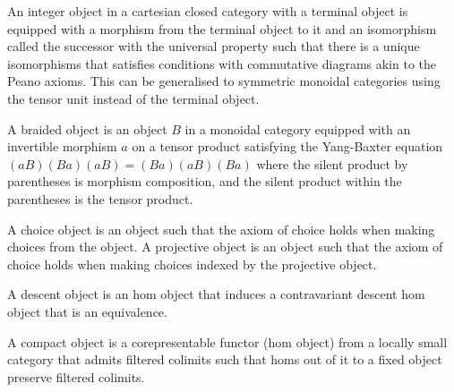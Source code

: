 \begin{definition}
    \label{definition-integer-object}
    An integer object in a cartesian closed category with a terminal object is equipped with a morphism from the terminal object to it and an isomorphism called the successor with the universal property such that there is a unique isomorphisms that satisfies conditions with commutative diagrams akin to the Peano axioms. This can be generalised to symmetric monoidal categories using the tensor unit instead of the terminal object.
\end{definition}

\begin{definition}
    \label{definition-braided-object}
    A braided object is an object $B$ in a monoidal category equipped with an invertible morphism $a$ on a tensor product satisfying the Yang-Baxter equation $(a B)(B a)(a B) = (B a)(a B)(B a)$ where the silent product by parentheses is morphism composition, and the silent product within the parentheses is the tensor product.
\end{definition}


\begin{definition}
    \label{definition-choice-object}
    A choice object is an object such that the axiom of choice holds when making choices from the object. A projective object is an object such that the axiom of choice holds when making choices indexed by the projective object.
\end{definition}

\begin{definition}
    \label{definition-descent-object}
    A descent object is an hom object that induces a contravariant descent hom object that is an equivalence.
\end{definition}

\begin{definition}
    \label{definition-compact-object}
    A compact object is a corepresentable functor (hom object) from a locally small category that admits filtered colimits such that homs out of it to a fixed object preserve filtered colimits.
\end{definition}

